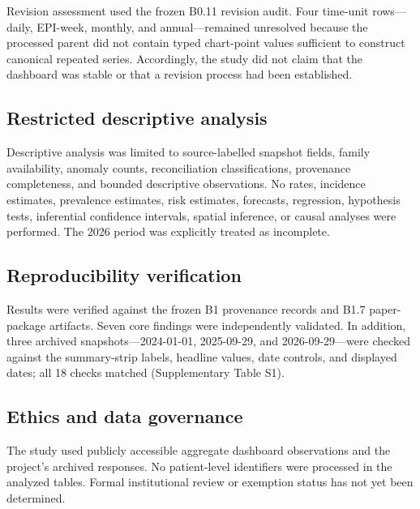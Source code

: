 Revision assessment used the frozen B0.11 revision audit. Four time-unit rows---daily, EPI-week, monthly, and annual---remained unresolved because the processed parent did not contain typed chart-point values sufficient to construct canonical repeated series. Accordingly, the study did not claim that the dashboard was stable or that a revision process had been established.

\subsection{Restricted descriptive analysis}

Descriptive analysis was limited to source-labelled snapshot fields, family availability, anomaly counts, reconciliation classifications, provenance completeness, and bounded descriptive observations. No rates, incidence estimates, prevalence estimates, risk estimates, forecasts, regression, hypothesis tests, inferential confidence intervals, spatial inference, or causal analyses were performed. The 2026 period was explicitly treated as incomplete.

\subsection{Reproducibility verification}

Results were verified against the frozen B1 provenance records and B1.7 paper-package artifacts. Seven core findings were independently validated. In addition, three archived snapshots---2024-01-01, 2025-09-29, and 2026-09-29---were checked against the summary-strip labels, headline values, date controls, and displayed dates; all 18 checks matched (Supplementary Table S1).

\subsection{Ethics and data governance}

The study used publicly accessible aggregate dashboard observations and the project's archived responses. No patient-level identifiers were processed in the analyzed tables. Formal institutional review or exemption status has not yet been determined.
